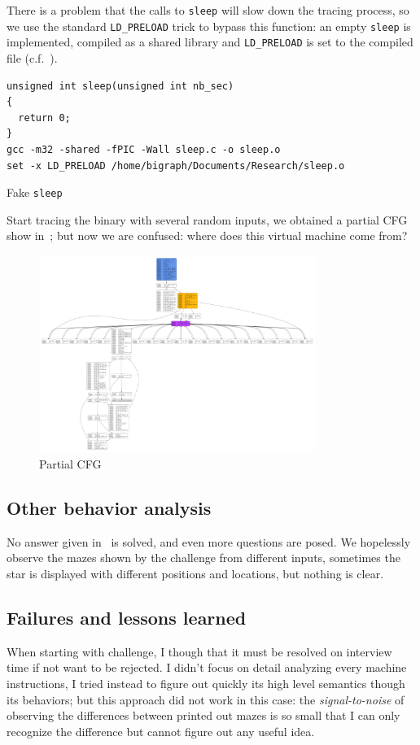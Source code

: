 \documentclass{easychair}
\begin{document}
There is a problem that the calls to \texttt{sleep} will slow down the tracing process, so we use the standard \texttt{LD\_PRELOAD} trick to bypass this function: an empty \texttt{sleep} is implemented, compiled as a shared library and \texttt{LD\_PRELOAD} is set to the compiled file (c.f.~).
\begin{listing}
  \begin{verbatim}
unsigned int sleep(unsigned int nb_sec)
{
  return 0;
}
gcc -m32 -shared -fPIC -Wall sleep.c -o sleep.o
set -x LD_PRELOAD /home/bigraph/Documents/Research/sleep.o
  \end{verbatim}
  \caption{Fake \texttt{sleep}}
  \label{fig:sleep}
\end{listing}
Start tracing the binary with several random inputs, we obtained a partial CFG show in~; but now we are confused: where does this virtual machine come from? 

\begin{figure}[h]
  \centering
  \includegraphics[width=0.8\textwidth,keepaspectratio]{mecung.pdf}
  \caption{Partial CFG}
  \label{fig:partial_cfg}
\end{figure}

\subsection{Other behavior analysis}
\label{sec:other_behavior_analysis}
No answer given in~ is solved, and even more questions are posed. We hopelessly observe the mazes shown by the challenge from different inputs, sometimes the star is displayed with different positions and locations, but nothing is clear.

\subsection{Failures and lessons learned}
When starting with challenge, I though that it must be resolved on interview time if not want to be rejected. I didn't focus on detail analyzing every machine instructions, I tried instead to figure out quickly its high level semantics though its behaviors; but this approach did not work in this case: the \emph{signal-to-noise} of observing the differences between printed out mazes is so small that I can only recognize the difference but cannot figure out any useful idea.
\end{document}
